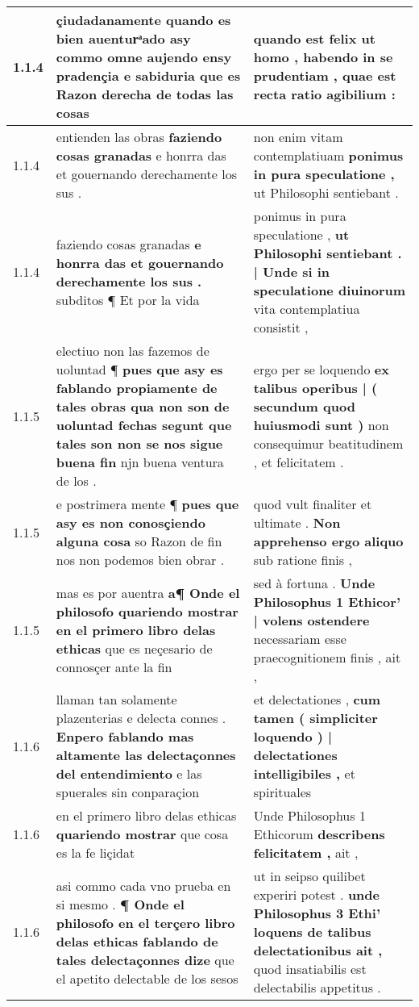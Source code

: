 \begin{tabular}{|p{1cm}|p{6.5cm}|p{6.5cm}|}
1.1.4 & çiudadanamente quando es bien auenturͣado \textbf{ asy commo omne aujendo ensy pradençia e sabiduria } que es Razon derecha de todas las cosas & quando est felix ut homo , \textbf{ habendo in se prudentiam , } quae est recta ratio agibilium : \\\hline
1.1.4 & entienden las obras \textbf{ faziendo cosas granadas } e honrra das et gouernando derechamente los sus . & non enim vitam contemplatiuam \textbf{ ponimus in pura speculatione , } ut Philosophi sentiebant . \\\hline
1.1.4 & faziendo cosas granadas \textbf{ e honrra das et gouernando derechamente los sus . } subditos ¶ Et por la vida & ponimus in pura speculatione , \textbf{ ut Philosophi sentiebant . | Unde si in speculatione diuinorum } vita contemplatiua consistit , \\\hline
1.1.5 & electiuo non las fazemos de uoluntad ¶ \textbf{ pues que asy es fablando propiamente de tales obras qua non son de uoluntad fechas segunt que tales son non se nos sigue buena fin } njn buena ventura de los . & ergo per se loquendo \textbf{ ex talibus operibus | ( secundum quod huiusmodi sunt ) } non consequimur beatitudinem , et felicitatem . \\\hline
1.1.5 & e postrimera mente ¶ \textbf{ pues que asy es non conosçiendo alguna cosa } so Razon de fin nos non podemos bien obrar . & quod vult finaliter et ultimate . \textbf{ Non apprehenso ergo aliquo } sub ratione finis , \\\hline
1.1.5 & mas es por auentra \textbf{ a¶ Onde el philosofo quariendo mostrar en el primero libro delas ethicas } que es neçesario de connosçer ante la fin & sed à fortuna . \textbf{ Unde Philosophus 1 Ethicor’ | volens ostendere } necessariam esse praecognitionem finis , ait , \\\hline
1.1.6 & llaman tan solamente plazenterias e delecta connes . \textbf{ Enpero fablando mas altamente las delectaçonnes del entendimiento } e las spuerales sin conparaçion & et delectationes , \textbf{ cum tamen ( simpliciter loquendo ) | delectationes intelligibiles , } et spirituales \\\hline
1.1.6 & en el primero libro delas ethicas \textbf{ quariendo mostrar } que cosa es la fe liçidat & Unde Philosophus 1 Ethicorum \textbf{ describens felicitatem , } ait , \\\hline
1.1.6 & asi commo cada vno prueba en si mesmo . \textbf{ ¶ Onde el philosofo en el terçero libro delas ethicas fablando de tales delectaçonnes dize } que el apetito delectable de los sesos & ut in seipso quilibet experiri potest . \textbf{ unde Philosophus 3 Ethi’ loquens de talibus delectationibus ait , } quod insatiabilis est delectabilis appetitus . \\\hline

\end{tabular}
